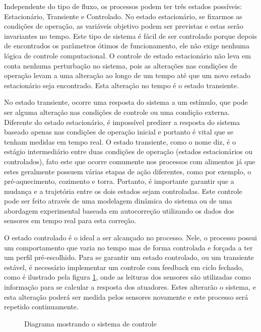 Independente do tipo de fluxo, os processos podem ter três estados possíveis: Estacionário, Transiente e Controlado. No estado estacionário, se fixarmos as condições de operação, as variáveis objetivo podem ser previstas e estas serão invariantes no tempo. Este tipo de sistema é fácil de ser controlado porque depois de encontrados os parâmetros ótimos de funcionamento, ele não exige nenhuma lógica de controle computacional. O controle de estado estacionário não leva em conta nenhuma perturbação no sistema, pois as alterações nas condições de operação levam a uma alteração ao longo de um tempo até que um novo estado estacionário seja encontrado. Esta alteração no tempo é o estado transiente.

No estado transiente, ocorre uma resposta do sistema a um estímulo, que pode ser alguma alteração nas condições de controle ou uma condição externa. Diferente do estado estacionário, é impossível predizer a resposta do sistema baseado apenas nas condições de operação inicial e portanto é vital que se tenham medidas em tempo real. O estado transiente, como o nome diz, é o estágio intermediário entre duas condições de operação (estados estacionários ou controlados), fato este que ocorre comumente nos processos com alimentos já que estes geralmente possuem várias etapas de ação diferentes, como por exemplo, o pré-aquecimento, cozimento e torra. Portanto, é importante garantir que a mudança e a trajetória entre os dois estados sejam controladas. Este controle pode ser feito através de uma modelagem dinâmica do sistema ou de uma abordagem experimental baseada em autocorreção utilizando os dados dos sensores em tempo real para esta correção. 

O estado controlado é o ideal a ser alcançado no processo. Nele, o processo possui um comportamento que varia no tempo mas de forma controlada e forçada a ter um perfil pré-escolhido. Para se garantir um estado controlado, ou um transiente estável, é necessário implementar um controle com feedback em ciclo fechado, como é ilustrado pela figura \ref{diagrama_controle}, onde as leituras dos sensores são utilizadas como informação para se calcular a resposta dos atuadores. Estes alterarão o sistema, e esta alteração poderá ser medida pelos sensores novamente e este processo será repetido continuamente. 

\begin{figure}[h]
    \centering
    
    \caption{Diagrama mostrando o sistema de controle }
    \label{diagrama_controle}
\end{figure}

